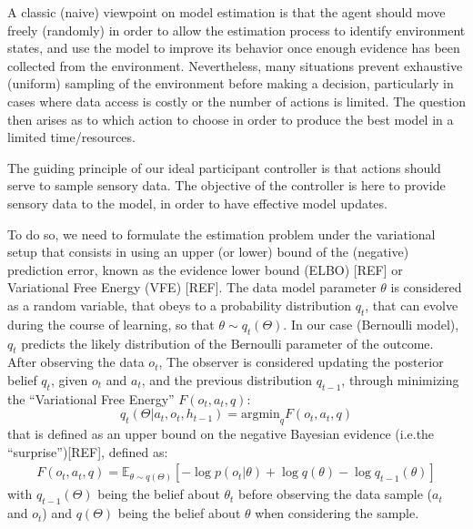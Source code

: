 \documentclass[10pt,letterpaper]{article}
\begin{document}
A classic (naive) viewpoint on model estimation is that the agent should move freely (randomly) in order to allow the estimation process to identify environment states, and use the model to improve its behavior once enough evidence has been collected from the environment. %
Nevertheless, many situations prevent exhaustive (uniform) sampling of the environment before making a decision, particularly in cases where data access is costly or the number of actions is limited. The question then arises as to which action to choose in order to produce the best model in a limited time/resources.


The guiding principle of our ideal participant controller is that actions should serve to sample sensory data.
The objective of the controller is here to provide sensory data to the model, in order to have effective model updates. 


To do so, we need to formulate the estimation problem under the variational setup that consists in using an upper (or lower) bound of the (negative) prediction error, known as the evidence lower bound (ELBO) [REF] or Variational Free Energy (VFE) [REF]. The data model parameter $\theta$ is considered as a random variable, that obeys to a probability distribution $q_t$, that can evolve during the course of learning, so that $\theta\sim q_t(\Theta)$. 
In our case (Bernoulli model), $q_t$ predicts the likely distribution of the Bernoulli parameter of the outcome. After observing the data $o_t$, The observer is considered updating the posterior belief  $q_t$, given $o_t$ and $a_t$, and the previous distribution $q_{t-1}$, %
through minimizing the ``Variational Free Energy'' $F(o_t,a_t,q)$:
$$q_t(\Theta|a_t, o_t, h_{t-1}) = \text{argmin}_{q} F(o_t,a_t,q)$$
that is defined as an upper bound on the negative Bayesian evidence (i.e.the ``surprise'')[REF], defined as: %
\begin{align}\label{eq:VFE}
F(o_t,a_t,q) = \mathbb{E}_{\theta\sim q(\Theta)}\left[ -\log p(o_t|\theta) + \log q(\theta) - \log q_{t-1}(\theta)\right]
\end{align}
with  $q_{t-1}(\Theta)$ being the belief about $\theta_t$ before observing the data sample ($a_t$ and $o_t$) and $q(\Theta)$ being the belief about $\theta$ when considering the sample.
\end{document}
